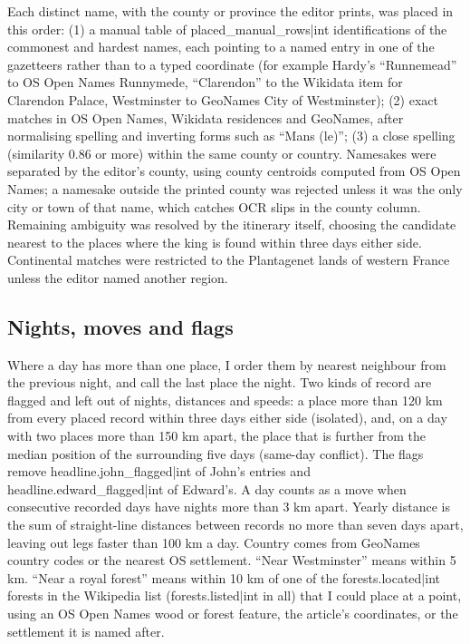 \documentclass[11pt,a4paper]{article}
\begin{document}
Each distinct name, with the county or province the editor prints, was placed in this order: (1) a manual table of {{placed_manual_rows|int}} identifications of the commonest and hardest names, each pointing to a named entry in one of the gazetteers rather than to a typed coordinate (for example Hardy's ``Runnemead'' to OS Open Names Runnymede, ``Clarendon'' to the Wikidata item for Clarendon Palace, Westminster to GeoNames City of Westminster); (2) exact matches in OS Open Names, Wikidata residences and GeoNames, after normalising spelling and inverting forms such as ``Mans (le)''; (3) a close spelling (similarity 0.86 or more) within the same county or country. Namesakes were separated by the editor's county, using county centroids computed from OS Open Names; a namesake outside the printed county was rejected unless it was the only city or town of that name, which catches OCR slips in the county column. Remaining ambiguity was resolved by the itinerary itself, choosing the candidate nearest to the places where the king is found within three days either side. Continental matches were restricted to the Plantagenet lands of western France unless the editor named another region.

\subsection{Nights, moves and flags}

Where a day has more than one place, I order them by nearest neighbour from the previous night, and call the last place the night. Two kinds of record are flagged and left out of nights, distances and speeds: a place more than 120 km from every placed record within three days either side (isolated), and, on a day with two places more than 150 km apart, the place that is further from the median position of the surrounding five days (same-day conflict). The flags remove {{headline.john_flagged|int}} of John's entries and {{headline.edward_flagged|int}} of Edward's. A day counts as a move when consecutive recorded days have nights more than 3 km apart. Yearly distance is the sum of straight-line distances between records no more than seven days apart, leaving out legs faster than 100 km a day. Country comes from GeoNames country codes or the nearest OS settlement. ``Near Westminster'' means within 5 km. ``Near a royal forest'' means within 10 km of one of the {{forests.located|int}} forests in the Wikipedia list ({{forests.listed|int}} in all) that I could place at a point, using an OS Open Names wood or forest feature, the article's coordinates, or the settlement it is named after.
\end{document}
